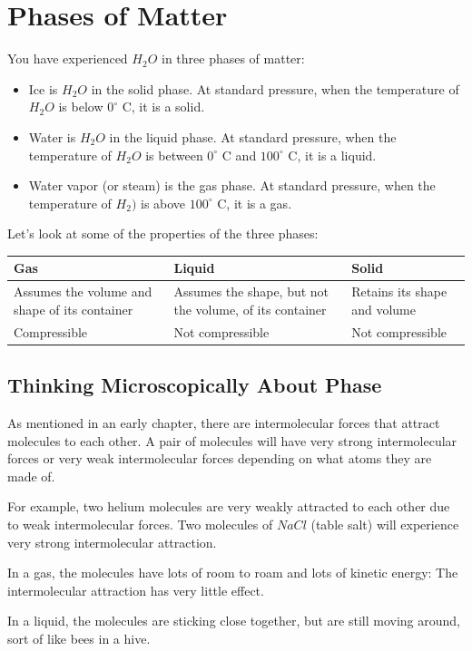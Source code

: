 \chapter{Phases of Matter}

You have experienced $H_2O$ in three phases of matter:
\begin{itemize}
\item Ice is $H_2O$ in the solid phase.  At standard pressure,  when the temperature of $H_2O$ is below $0^\circ$ C,  it is a solid.  
\item Water is $H_2O$ in the liquid phase.  At standard pressure, when the temperature of $H_2O$ is between $0^\circ$ C and  $100^\circ$ C,  it is a liquid.
\item Water vapor (or steam) is the gas phase.  At standard pressure,  when the temperature of $H_2)$ is above $100^\circ$ C,  it is a gas.
\end{itemize}

Let's look at some of the properties of the three phases:

\begin{tabular}{p{5cm}|p{5cm}|p{5cm}}
Gas & Liquid & Solid \\
\hline
Assumes the volume and shape of its container & 
Assumes the shape, but not the volume, of its container &
Retains its shape and volume \\
\hline
Compressible & Not compressible & Not compressible \\
\end{tabular}

\section{Thinking Microscopically About Phase}

As mentioned in an early chapter,  there are intermolecular forces that attract molecules to each
other.   A pair of molecules will have very strong intermolecular forces or very weak intermolecular forces
depending on what atoms they are made of.

For example,  two helium molecules are very weakly attracted to each other due to weak intermolecular forces.   Two molecules of $NaCl$ (table salt) will experience very strong intermolecular attraction.

In a gas,  the molecules have lots of room to roam and lots of kinetic energy: The intermolecular attraction has very little effect.

In a liquid,  the molecules are sticking close together,  but are still moving around,  sort of like bees in a hive.

